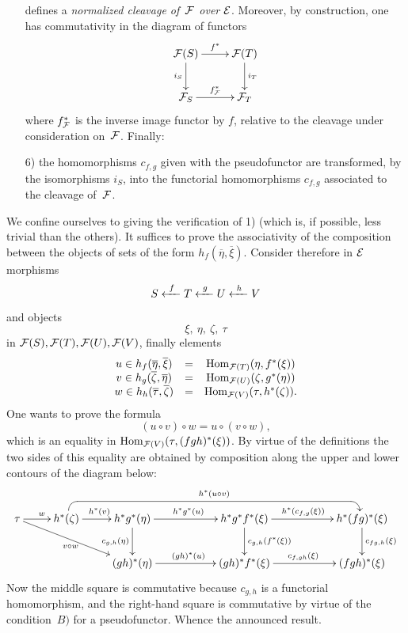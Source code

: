 \begin{enumerate}
defines a \emph{normalized cleavage of~$\cal{F}$ over}
$\cal{E}$. Moreover, by construction, one has commutativity in the
diagram of functors
$$
\xymatrix{
\cal{F}(S) \ar[r]^{f^*} \ar[d]_{i_S} & \cal{F}(T) \ar[d]^{i_T} \\
\cal{F}_S \ar[r]^{f^*_{\cal{F}}} & \cal{F}_T }
$$
where $f^*_{\cal{F}}$ is the inverse image functor by $f$, relative
to the cleavage under consideration on~$\cal{F}$. Finally:
\item[6)] the homomorphisms $c_{f,g}$ given with the
pseudofunctor are transformed, by the isomorphisms $i_S$, into
the functorial homomorphisms $c_{f,g}$ associated to the cleavage
of~$\cal{F}$.
\end{enumerate}

We confine ourselves to giving the verification of 1) (which is, if
possible, less trivial than the others). It suffices to prove
the associativity of the composition between the objects of sets of
the form $h_f(\overline{\eta},\overline{\xi})$. Consider therefore
in $\cal{E}$ morphisms
$$
S\lfrom{f} T\lfrom{g} U\lfrom{h} V
$$
and objects
$$
\xi,\ \eta,\ \zeta,\ \tau
$$
in $\cal{F}(S),\cal{F}(T),\cal{F}(U),\cal{F}(V)$, finally
elements
$$
\begin{array}{ccc}
u\in
h_f(\overline{\eta},\overline{\xi})&=&\Hom_{\cal{F}(T)}(\eta,f^*(\xi))\\
v\in
h_g(\overline{\zeta},\overline{\eta})&=&\Hom_{\cal{F}(U)}(\zeta,g^*(\eta))\\
w\in
h_h(\overline{\tau},\overline{\zeta})&=&\Hom_{\cal{F}(V)}(\tau,h^*(\zeta)).
\end{array}
$$
One
wants to prove the formula
$$
(u\circ v)\circ w = u\circ (v\circ w),
$$
which is an equality in
$\Hom_{\cal{F}(V)}(\tau,(fgh)^*(\xi))$. By virtue of the definitions
the two sides of this equality are obtained by composition
along the upper and lower contours of the diagram
below:
$$
\xymatrix{
\tau \ar[r]^w \ar[drr]_{v\circ w} & h^*(\zeta)
\ar[r]^{h^*(v)} \ar@<-2pt>
`u[rrrrr] `[rrrrr]^{h^*(u\circ v)} [rrrrr] & h^*g^*(\eta)
\ar[rr]^{h^*g^*(u)}
\ar[d]_{c_{g,h}(\eta)} & & h^*g^*f^*(\xi) \ar[rr]^{h^*(c_{f,g}(\xi))}
\ar[d]^{c_{g,h}(f^*(\xi))} & & h^*(fg)^*(\xi) \ar[d]^{c_{fg,h}(\xi)} \\
& & (gh)^*(\eta) \ar[rr]^{(gh)^*(u)} & & (gh)^*f^*(\xi)
\ar[rr]^{c_{f,gh}(\xi)} & & (fgh)^*(\xi) }
$$
Now the middle square is commutative because $c_{g,h}$ is a
functorial homomorphism, and the right-hand square is commutative by
virtue of the condition~$B)$ for a pseudofunctor. Whence the
announced result.

